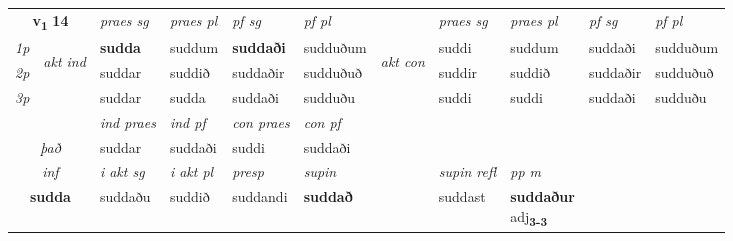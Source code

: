 \noindent
\begin{tabular}{lllllllllll} \toprule
\multicolumn{2}{c}{\textbf{v{\textsubscript{1}}} \Large{\textbf{14}}}  &  \textit{praes sg}  & \textit{praes pl}  &\textit{ pf sg} & \textit{pf pl} &  &  \textit{praes sg}  & \textit{praes pl}  & \textit{pf sg} & \textit{pf pl } \\*
	\cmidrule{3-6} \cmidrule{8-11}
 {\textit{1p}} & \multirow{3}{*}{\begin{turn}{90}\textit{akt ind}\end{turn}} & \textbf{sudda} & suddum & \textbf{suddaði} & sudduðum & \multirow{3}{*}{\begin{turn}{90}\textit{akt con}\end{turn}} &suddi & suddum & suddaði & sudduðum\\*
 {\textit{2p}} &  &  suddar  & suddið & suddaðir & sudduðuð & & suddir & suddið & suddaðir & sudduðuð \\*
{\textit{3p}} &  & suddar & sudda & suddaði & sudduðu & & suddi & suddi& suddaði & sudduðu \\*
\cmidrule{3-6} \cmidrule{8-11}

   & &  \textit{ind praes} & \textit{ind pf} & \textit{con praes} & \textit{con pf} \\*
\multicolumn{2}{c}{ \textit{það} } & suddar & suddaði & suddi & suddaði \\*

\cmidrule{3-9}
   \multicolumn{2}{c}{\textit{inf}}  & \textit{i akt sg} & \textit{i akt pl}   & \textit{presp} & \textit{supin} && \textit{supin refl} & \textit{pp m} \\*
  \multicolumn{2}{c}{\textbf{sudda}} & suddaðu  & suddið   & suddandi &  \textbf{suddað} && suddast & \specialcell{\textbf{suddaður} \\ adj\textbf{\textsubscript{3-3}}} \\*
\end{tabular}

